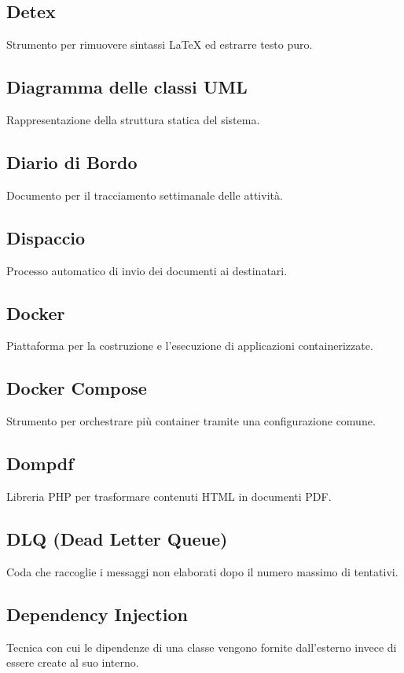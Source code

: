 \documentclass[a4paper,12pt]{article}
\begin{document}
\subsection{Detex}
Strumento per rimuovere sintassi LaTeX ed estrarre testo puro.

\subsection{Diagramma delle classi UML}
Rappresentazione della struttura statica del sistema.

\subsection{Diario di Bordo}
Documento per il tracciamento settimanale delle attività.

\subsection{Dispaccio}
Processo automatico di invio dei documenti ai destinatari.

\subsection{Docker}
Piattaforma per la costruzione e l'esecuzione di applicazioni containerizzate.

\subsection{Docker Compose}
Strumento per orchestrare più container tramite una configurazione comune.

\subsection{Dompdf}
Libreria PHP per trasformare contenuti HTML in documenti PDF.

\subsection{DLQ (Dead Letter Queue)}
Coda che raccoglie i messaggi non elaborati dopo il numero massimo di tentativi.

\subsection{Dependency Injection}
Tecnica con cui le dipendenze di una classe vengono fornite dall'esterno invece di essere create al suo interno.
\end{document}
